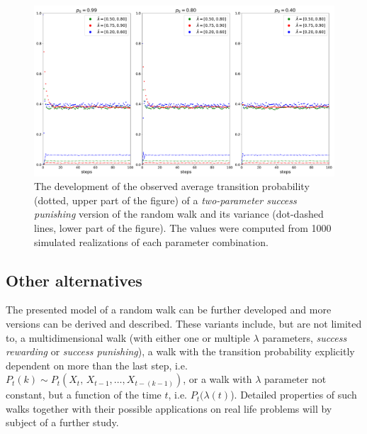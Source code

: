\documentclass{amsart}
\theoremstyle{definition}
\theoremstyle{plain}
\theoremstyle{plain}
\theoremstyle{plain}
\numberwithin{equation}{section}
\begin{document}
    \begin{figure}
        \begin{center}
            \includegraphics[width=1\textwidth]{../simulations/e_probability_1000_walks_100_steps_type_success_punished_two_lambdas}
            \caption{\label{fig:Development-punish2l}The development of the observed average
            transition probability (dotted, upper part of the figure) of a \emph{two-parameter success
            punishing} version of the random walk and its variance (dot-dashed lines, lower part of the figure).
            The values
            were computed from 1000 simulated realizations of each parameter
            combination.}
        \end{center}
    \end{figure}

    \subsection{Other alternatives}\label{subsec:other-alternatives}

    The presented model of a random walk can be further developed and
    more versions can be derived and described.
    These variants include,
    but are not limited to, a multidimensional walk (with either one or multiple
    $\lambda$ parameters, \emph{success rewarding} or \emph{success
    punishing}), a walk with the transition probability explicitly dependent
    on more than the last step, i.e. $P_{t}(k)\sim P_{t}(X_{t},\,X_{t-1},\dots,X_{t-(k-1)})$,
    or a walk with $\lambda$ parameter not constant, but a function
    of the time $t$, i.e. $P_{t}(\lambda(t)$).
    Detailed properties of
    such walks together with their possible applications on real life
    problems will by subject of a further study.
\end{document}
